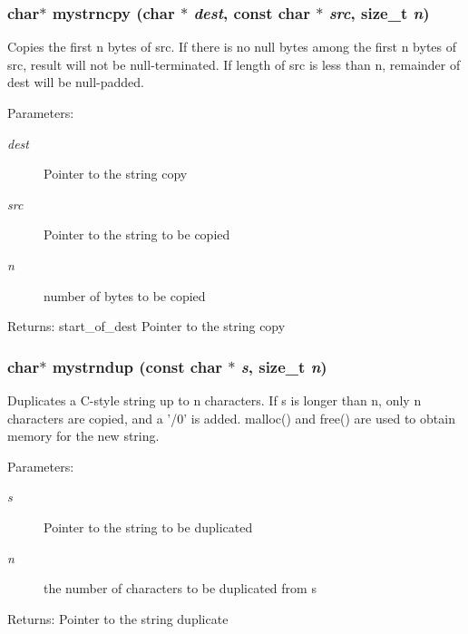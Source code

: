 \subsubsection{\setlength{\rightskip}{0pt plus 5cm}char$\ast$ mystrncpy (char $\ast$ {\em dest}, const char $\ast$ {\em src}, size\_\-t {\em n})}\label{mystring_8c_86b7a78bb3914b2c6e6022b482c4a534}


Copies the first n bytes of src. If there is no null bytes among the first n bytes of src, result will not be null-terminated. If length of src is less than n, remainder of dest will be null-padded. \begin{Desc}
\item[Parameters:]
\begin{description}
\item[{\em dest}]Pointer to the string copy \item[{\em src}]Pointer to the string to be copied \item[{\em n}]number of bytes to be copied \end{description}
\end{Desc}
\begin{Desc}
\item[Returns:]start\_\-of\_\-dest Pointer to the string copy \end{Desc}
\subsubsection{\setlength{\rightskip}{0pt plus 5cm}char$\ast$ mystrndup (const char $\ast$ {\em s}, size\_\-t {\em n})}\label{mystring_8c_9dc11eca5ee6b0e312610650bbe36e6d}


Duplicates a C-style string up to n characters. If s is longer than n, only n characters are copied, and a '/0' is added. malloc() and free() are used to obtain memory for the new string. \begin{Desc}
\item[Parameters:]
\begin{description}
\item[{\em s}]Pointer to the string to be duplicated \item[{\em n}]the number of characters to be duplicated from s \end{description}
\end{Desc}
\begin{Desc}
\item[Returns:]Pointer to the string duplicate \end{Desc}

